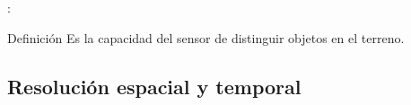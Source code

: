 \begin{frame}{\secname : \subsecname}
    \begin{block}{Definición}
        Es la capacidad del sensor de distinguir objetos en el terreno.%
    \end{block}
                                                                                                                                                                                                                                                                                                                                                                                                                                                                                                                                                                                                                                                                                                                                                                                                                                                                                                                                                                                                                                                                                                                                                                                                                                                                                                                                                                                                                                                                                                                                                                                                                                                                                                                                                                                                                                                                                                                                                                                                                                                                                                                                                              \end{frame}

\subsection{Resolución espacial y temporal}

